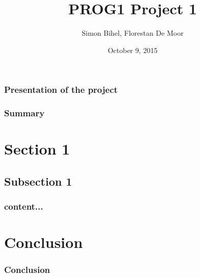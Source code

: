 \documentclass{beamer}
\title[Defense]{PROG1 Project 1}
\author{Simon Bihel, Florestan De Moor}
\institute[ENS Rennes]{\texttt{[image: ENS\_Rennes.png]}\\Computer Science Department, 1st year}
\date{October 9, 2015}
\begin{document}
	\begin{frame}
		\maketitle
	\end{frame}
	
	\begin{frame}
		\frametitle{Presentation of the project}
	\end{frame}
	
	\begin{frame}
		\frametitle{Summary}
		\tableofcontents
	\end{frame}
	
	\section{Section 1}
	\subsection*{Subsection 1}
	\begin{frame}
		\frametitle{content...}
	\end{frame}
	
	\section*{Conclusion}
	\begin{frame}
		\frametitle{Conclusion}
	\end{frame}
\end{document}
